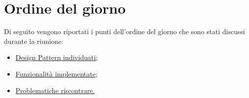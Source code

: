 \clearpage
\section{Ordine del giorno}
Di seguito vengono riportati i punti dell’ordine del giorno che sono stati discussi durante la riunione:
\begin{itemize}
	\item \hyperref[sec:pattern]{Design Pattern individuati;}
	\item \hyperref[sec:funzionalità]{Funzionalità implementate;}
	\item \hyperref[sec:problemi]{Problematiche riscontrare.}
\end{itemize}
